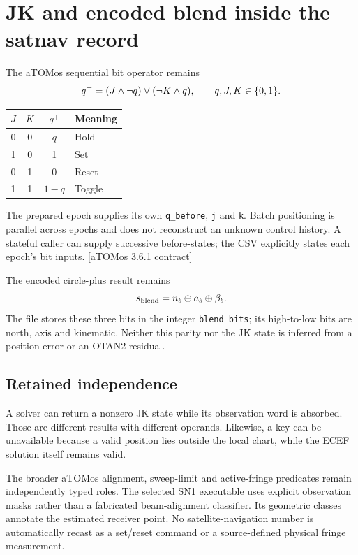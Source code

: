\documentclass[11pt,a4paper]{article}
\newcommand{\code}[1]{\texttt{#1}}
\newcommand{\aRef}{\textcolor{muted}{[aTOMos 3.6.1 contract]}}
\begin{document}
\section{JK and encoded blend inside the satnav record}
The aTOMos sequential bit operator remains
\begin{equation}
q^+=(J\land\neg q)\lor(\neg K\land q),\qquad q,J,K\in\{0,1\}.
\end{equation}
\begin{center}
\begin{tabular}{@{}cccl@{}}\toprule
$J$&$K$&$q^+$&\textbf{Meaning}\\\midrule
0&0&$q$&Hold\\1&0&1&Set\\0&1&0&Reset\\1&1&$1-q$&Toggle\\\bottomrule
\end{tabular}
\end{center}
The prepared epoch supplies its own \code{q\_before}, \code{j} and \code{k}. Batch positioning is parallel across
epochs and does not reconstruct an unknown control history. A stateful caller can supply successive before-states;
the CSV explicitly states each epoch's bit inputs. \aRef

The encoded circle-plus result remains
\begin{equation}
s_{\rm blend}=n_b\oplus a_b\oplus\beta_b.
\end{equation}
The file stores these three bits in the integer \code{blend\_bits}; its high-to-low bits are north, axis and
kinematic. Neither this parity nor the JK state is inferred from a position error or an OTAN2 residual.

\subsection{Retained independence}
A solver can return a nonzero JK state while its observation word is absorbed. Those are different results
with different operands. Likewise, a key can be unavailable because a valid position lies outside the local
chart, while the ECEF solution itself remains valid.

The broader aTOMos alignment, sweep-limit and active-fringe predicates remain independently typed roles.
The selected SN1 executable uses explicit observation masks rather than a fabricated beam-alignment
classifier. Its geometric classes annotate the estimated receiver point. No satellite-navigation number is
automatically recast as a set/reset command or a source-defined physical fringe measurement.
\end{document}
